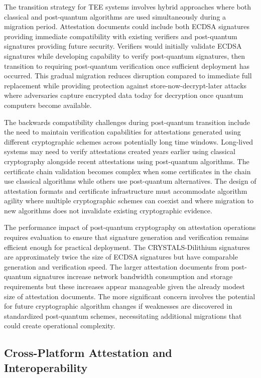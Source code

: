 The transition strategy for TEE systems involves hybrid approaches where both classical and post-quantum algorithms are used simultaneously during a migration period. Attestation documents could include both ECDSA signatures providing immediate compatibility with existing verifiers and post-quantum signatures providing future security. Verifiers would initially validate ECDSA signatures while developing capability to verify post-quantum signatures, then transition to requiring post-quantum verification once sufficient deployment has occurred. This gradual migration reduces disruption compared to immediate full replacement while providing protection against store-now-decrypt-later attacks where adversaries capture encrypted data today for decryption once quantum computers become available.

The backwards compatibility challenges during post-quantum transition include the need to maintain verification capabilities for attestations generated using different cryptographic schemes across potentially long time windows. Long-lived systems may need to verify attestations created years earlier using classical cryptography alongside recent attestations using post-quantum algorithms. The certificate chain validation becomes complex when some certificates in the chain use classical algorithms while others use post-quantum alternatives. The design of attestation formats and certificate infrastructure must accommodate algorithm agility where multiple cryptographic schemes can coexist and where migration to new algorithms does not invalidate existing cryptographic evidence.

The performance impact of post-quantum cryptography on attestation operations requires evaluation to ensure that signature generation and verification remains efficient enough for practical deployment. The CRYSTALS-Dilithium signatures are approximately twice the size of ECDSA signatures but have comparable generation and verification speed. The larger attestation documents from post-quantum signatures increase network bandwidth consumption and storage requirements but these increases appear manageable given the already modest size of attestation documents. The more significant concern involves the potential for future cryptographic algorithm changes if weaknesses are discovered in standardized post-quantum schemes, necessitating additional migrations that could create operational complexity.

\subsection{Cross-Platform Attestation and Interoperability}

